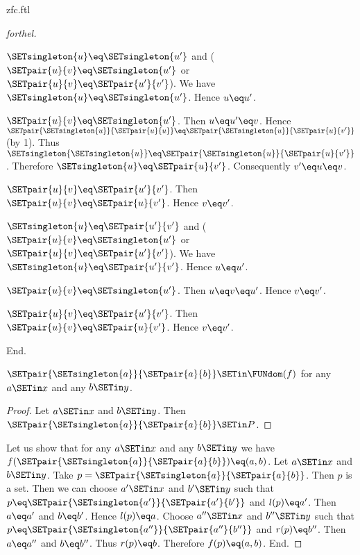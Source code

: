 \documentclass{naproche-library}
\begin{document}
\begin{smodule}[title=ZFC]{zfc.ftl}
\begin{proof}[forthel]
    \begin{case}{$\SETsingleton{u} \eq \SETsingleton{u'}$ and ($\SETpair{u}{v} \eq \SETsingleton{u'}$ or $\SETpair{u}{v} \eq \SETpair{u'}{v'}$).}
      We have $\SETsingleton{u} \eq \SETsingleton{u'}$.
      Hence $u \eq u'$.

      \begin{case}{$\SETpair{u}{v} \eq \SETsingleton{u'}$.}
        Then $u \eq u'\eq v$.
        Hence $\SETpair{\SETsingleton{u}}{\SETpair{u}{u}} \eq \SETpair{\SETsingleton{u}}{\SETpair{u}{v'}}$ (by 1).
        Thus $\SETsingleton{\SETsingleton{u}} \eq \SETpair{\SETsingleton{u}}{\SETpair{u}{v'}}$.
        Therefore $\SETsingleton{u} \eq \SETpair{u}{v'}$.
        Consequently $v' \eq u \eq v$.
      \end{case}

      \begin{case}{$\SETpair{u}{v} \eq \SETpair{u'}{v'}$.}
        Then $\SETpair{u}{v} \eq \SETpair{u}{v'}$.
        Hence $v \eq v'$.
      \end{case}
    \end{case}

    \begin{case}{$\SETsingleton{u} \eq \SETpair{u'}{v'}$ and ($\SETpair{u}{v} \eq \SETsingleton{u'}$ or $\SETpair{u}{v} \eq \SETpair{u'}{v'}$).}
      We have $\SETsingleton{u} \eq \SETpair{u'}{v'}$.
      Hence $u \eq u'$.

      \begin{case}{$\SETpair{u}{v} \eq \SETsingleton{u'}$.}
        Then $u \eq v \eq u'$.
        Hence $v \eq v'$.
      \end{case}

      \begin{case}{$\SETpair{u}{v} \eq \SETpair{u'}{v'}$.}
        Then $\SETpair{u}{v} \eq \SETpair{u}{v'}$.
        Hence $v \eq v'$.
      \end{case}
    \end{case}
  End.

  $\SETpair{\SETsingleton{a}}{\SETpair{a}{b}} \SETin \FUNdom(f)$ for any $a \SETin x$ and any $b \SETin y$. %
  \begin{proof}
    Let $a \SETin x$ and $b \SETin y$.
    Then $\SETpair{\SETsingleton{a}}{\SETpair{a}{b}} \SETin P$.
  \end{proof}

  Let us show that for any $a \SETin x$ and any $b \SETin y$ we have $f(\SETpair{\SETsingleton{a}}{\SETpair{a}{b}}) \eq (a,b)$.
    Let $a \SETin x$ and $b \SETin y$.
    Take $p = \SETpair{\SETsingleton{a}}{\SETpair{a}{b}}$.
    Then $p$ is a set.
    Then we can choose $a' \SETin x$ and $b' \SETin y$ such that $p \eq \SETpair{\SETsingleton{a'}}{\SETpair{a'}{b'}}$ and $l(p) \eq a'$.
    Then $a \eq a'$ and $b \eq b'$.
    Hence $l(p) \eq a$.
    Choose $a'' \SETin x$ and $b'' \SETin y$ such that $p \eq \SETpair{\SETsingleton{a''}}{\SETpair{a''}{b''}}$ and $r(p) \eq b''$.
    Then $a \eq a''$ and $b \eq b''$.
    Thus $r(p) \eq b$.
    Therefore $f(p) \eq (a,b)$.
  End.


\end{proof}
\end{smodule}
\end{document}
